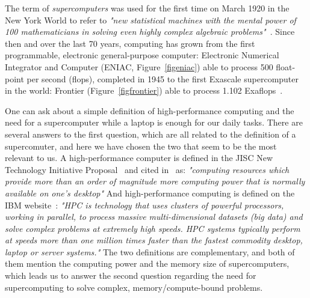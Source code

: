 The term of \textit{supercomputers} was used for the first time on March 1920 in the New York World to refer to \textit{"new statistical machines with the mental power of 100 mathematicians in solving even highly complex algebraic problems"}~\cite{schneck_supercomputer_1987}. Since then and over the last 70 years, computing has grown from the first programmable, electronic general-purpose computer: Electronic Numerical Integrator and Computer (ENIAC, Figure~\ref{figeniac}) able to process 500 float-point per second (flops), completed in 1945 to the first Exascale supercomputer in the world: Frontier (Figure~\ref{figfrontier}) able to process 1.102 Exaflops~\cite{top500, frontier}. 

One can ask about a simple definition of high-performance computing and the need for a supercomputer while a laptop is enough for our daily tasks. There are several answers to the first question, which are all related to the definition of a supercomuter, and here we have chosen the two that seem to be the most relevant to us.   
A high-performance computer is defined in the JISC New Technology Initiative Proposal~\cite{JISC} and cited in~\cite{hpc} as:
\textit{"computing resources which provide more than an order of magnitude more computing power that is normally available on one's desktop"} 
And high-performance computing is defined on the IBM website~\cite{ibm}: 
\textit{"HPC is technology that uses clusters of powerful processors, working in parallel, to process massive multi-dimensional datasets (big data) and solve complex problems at extremely high speeds. HPC systems typically perform at speeds more than one million times faster than the fastest commodity desktop, laptop or server systems."}
The two definitions are complementary, and both of them mention the computing power and the memory size of supercomputers, which leads us to answer the second question regarding the need for supercomputing to solve complex, memory/compute-bound problems. 


